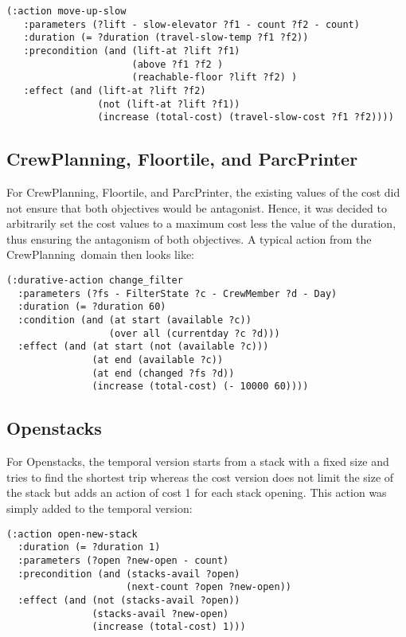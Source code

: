 \documentclass[letterpaper]{article}
\newcommand{\OPENSTACKS}{{\sc Openstacks}}
\newcommand{\CREWPLANNING}{{\sc CrewPlanning}}
\newcommand{\FLOORTILE}{{\sc Floortile}}
\newcommand{\PARCPRINTER}{{\sc ParcPrinter}}
\begin{document}
\begin{verbatim}
(:action move-up-slow
   :parameters (?lift - slow-elevator ?f1 - count ?f2 - count)
   :duration (= ?duration (travel-slow-temp ?f1 ?f2))
   :precondition (and (lift-at ?lift ?f1) 
                      (above ?f1 ?f2 )
                      (reachable-floor ?lift ?f2) )
   :effect (and (lift-at ?lift ?f2) 
                (not (lift-at ?lift ?f1)) 
                (increase (total-cost) (travel-slow-cost ?f1 ?f2))))
\end{verbatim}

\subsection{\CREWPLANNING, \FLOORTILE, and \PARCPRINTER}

For \CREWPLANNING, \FLOORTILE, and \PARCPRINTER, the existing values of the cost did not ensure that both objectives would be antagonist. Hence, it was decided to arbitrarily set the cost values to a maximum cost less the value of the duration, thus ensuring the antagonism of both objectives. A typical action from the \CREWPLANNING\ domain then looks like:

\begin{verbatim}
(:durative-action change_filter
  :parameters (?fs - FilterState ?c - CrewMember ?d - Day)
  :duration (= ?duration 60)
  :condition (and (at start (available ?c))
                  (over all (currentday ?c ?d)))
  :effect (and (at start (not (available ?c)))
               (at end (available ?c))
               (at end (changed ?fs ?d))
               (increase (total-cost) (- 10000 60))))
\end{verbatim}


\subsection{\OPENSTACKS}

For \OPENSTACKS, the temporal version starts from a stack with a fixed size and tries to find the shortest trip whereas the cost version does not limit the size of the stack but adds an action of cost 1 for each stack opening. This action was simply added to the temporal version:

\begin{verbatim}
(:action open-new-stack
  :duration (= ?duration 1)
  :parameters (?open ?new-open - count)
  :precondition (and (stacks-avail ?open)
                     (next-count ?open ?new-open))
  :effect (and (not (stacks-avail ?open))
               (stacks-avail ?new-open) 
               (increase (total-cost) 1)))
\end{verbatim}
\end{document}
